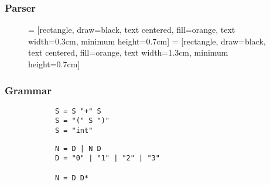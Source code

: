 \documentclass{beamer}
\begin{document}
    \begin{frame}
        \frametitle{Parser}
        \begin{figure}
         = [rectangle, draw=black, text centered, fill=orange, text width=0.3cm, minimum height=0.7cm]
         = [rectangle, draw=black, text centered, fill=orange, text width=1.3cm, minimum height=0.7cm]
        \end{figure}
    \end{frame}

    \begin{frame}[fragile]
        \frametitle{Grammar}
        \begin{verbatim}
            S = S "+" S
            S = "(" S ")"
            S = "int"
        \end{verbatim}

        \begin{verbatim}
            N = D | N D
            D = "0" | "1" | "2" | "3"

            N = D D*
        \end{verbatim}
    \end{frame}
\end{document}
